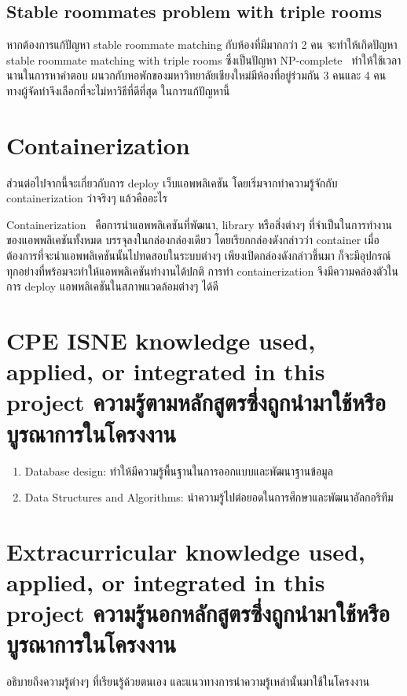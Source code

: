 \subsection{Stable roommates problem with triple rooms}
หากต้องการแก้ปัญหา stable roommate matching กับห้องที่มีมากกว่า 2 คน จะทำให้เกิดปัญหา
stable roommate matching with triple rooms ซึ่งเป็นปัญหา NP-complete~\cite{iwama2007stable}
ทำให้ใช้เวลานานในการหาคำตอบ ผนวกกับหอพักของมหาวิทยาลัยเชียงใหม่มีห้องที่อยู่ร่วมกัน 3 คนและ 4 คน
ทางผู้จัดทำจึงเลือกที่จะไม่หาวิธีที่ดีที่สุด ในการแก้ปัญหานี้


\section{Containerization}
ส่วนต่อไปจากนี้จะเกี่ยวกับการ deploy เว็บแอพพลิเคชัน โดยเริ่มจากทำความรู้จักกับ 
containerization ว่าจริงๆ แล้วคืออะไร

Containerization~\cite{ctnrh} คือการนำแอพพลิเคชันที่พัฒนา, library หรือสิ่งต่างๆ ที่จำเป็นในการทำงานของแอพพลิเคชันทั้งหมด บรรจุลงในกล่องกล่องเดียว โดยเรียกกล่องดังกล่าวว่า container 
เมื่อต้องการที่จะนำแอพพลิเคชันนั้นไปทดสอบในระบบต่างๆ เพียงเปิดกล่องดังกล่าวขึ้นมา
ก็จะมีอุปกรณ์ทุกอย่างที่พร้อมจะทำให้แอพพลิเคชันทำงานได้ปกติ การทำ containerization 
จึงมีความคล่องตัวในการ deploy แอพพลิเคชันในสภาพแวดล้อมต่างๆ ได้ดี 

\section{\ifenglish%
\ifcpe CPE \else ISNE \fi knowledge used, applied, or integrated in this project
\else%
ความรู้ตามหลักสูตรซึ่งถูกนำมาใช้หรือบูรณาการในโครงงาน
\fi
}
\begin{enumerate}
  \item Database design: ทำให้มีความรู้พื้นฐานในการออกแบบและพัฒนาฐานข้อมูล
  \item Data Structures and Algorithms: นำความรู้ไปต่อยอดในการศึกษาและพัฒนาอัลกอริทึม
\end{enumerate}


\section{\ifenglish%
Extracurricular knowledge used, applied, or integrated in this project
\else%
ความรู้นอกหลักสูตรซึ่งถูกนำมาใช้หรือบูรณาการในโครงงาน
\fi
}

อธิบายถึงความรู้ต่างๆ ที่เรียนรู้ด้วยตนเอง และแนวทางการนำความรู้เหล่านั้นมาใช้ในโครงงาน
